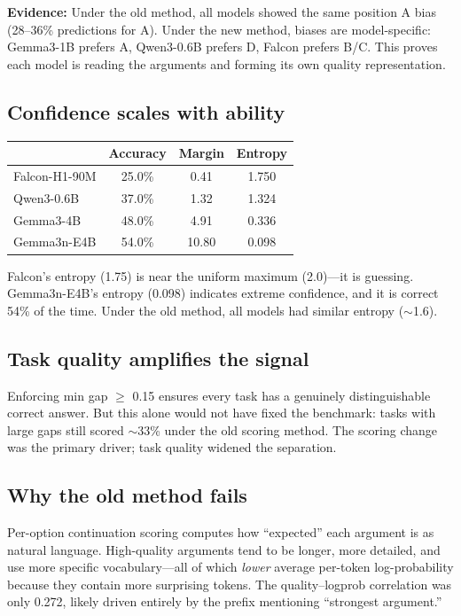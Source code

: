 \documentclass[11pt,a4paper]{article}
\begin{document}
\textbf{Evidence:} Under the old method, all models showed the same position A bias (28--36\% predictions for A).
Under the new method, biases are model-specific: Gemma3-1B prefers A, Qwen3-0.6B prefers D, Falcon prefers B/C.
This proves each model is reading the arguments and forming its own quality representation.

\subsection{Confidence scales with ability}

\begin{table}[h]
\centering
\small
\begin{tabular}{@{}lccc@{}}
\toprule
& Accuracy & Margin & Entropy \\
\midrule
Falcon-H1-90M & 25.0\% & 0.41 & 1.750 \\
Qwen3-0.6B    & 37.0\% & 1.32 & 1.324 \\
Gemma3-4B     & 48.0\% & 4.91 & 0.336 \\
Gemma3n-E4B   & 54.0\% & 10.80 & 0.098 \\
\bottomrule
\end{tabular}
\end{table}

Falcon's entropy (1.75) is near the uniform maximum (2.0)---it is guessing.
Gemma3n-E4B's entropy (0.098) indicates extreme confidence, and it is correct 54\% of the time.
Under the old method, all models had similar entropy ($\sim$1.6).

\subsection{Task quality amplifies the signal}

Enforcing min gap $\geq$ 0.15 ensures every task has a genuinely distinguishable correct answer.
But this alone would not have fixed the benchmark: tasks with large gaps still scored $\sim$33\% under the old scoring method.
The scoring change was the primary driver; task quality widened the separation.

\subsection{Why the old method fails}

Per-option continuation scoring computes how ``expected'' each argument is as natural language.
High-quality arguments tend to be longer, more detailed, and use more specific vocabulary---all of which \emph{lower} average per-token log-probability because they contain more surprising tokens.
The quality--logprob correlation was only 0.272, likely driven entirely by the prefix mentioning ``strongest argument.''
\end{document}
